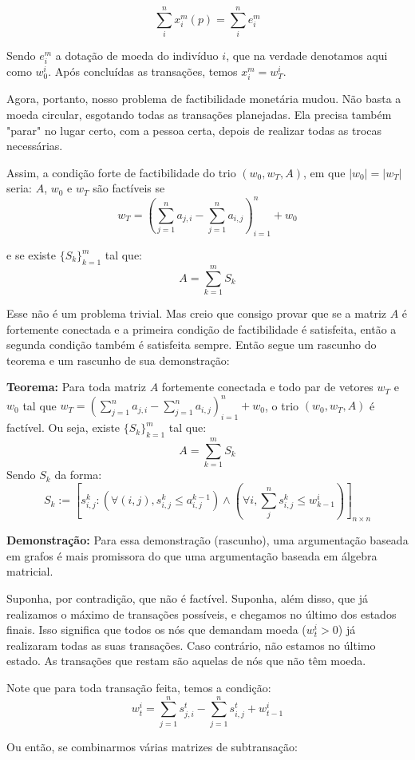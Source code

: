 \documentclass{article}
\begin{document}
$$ \sum^{n}_{i}x^m_i(p) = \sum^n_{i} e^m_i$$
\par Sendo $e^m_i$ a dotação de moeda do indivíduo $i$, que na verdade denotamos aqui como $w^i_0$. Após concluídas as transações, temos $x^m_i = w^i_T$.
\par Agora, portanto, nosso problema de factibilidade monetária mudou. Não basta a moeda circular, esgotando todas as transações planejadas. Ela precisa também "parar" no lugar certo, com a pessoa certa, depois de realizar todas as trocas necessárias.
\par Assim, a condição forte de factibilidade do trio $(w_0, w_T,  A)$, em que $|w_0| = |w_T|$ seria: $A$, $w_0$  e $w_T$ são factíveis se $$w_T = (\sum^n_{j=1}{a_{j,i}} -\sum^n_{j=1}{a_{i,j}}  )^n_{i=1}+w_0$$
\par e se existe $\{S_k\}^m_{k=1}$ tal que:
$$ A = \sum^m_{k=1} S_k$$
\par Esse não é um problema trivial. Mas creio que consigo provar que se a matriz $A$ é fortemente conectada e a primeira condição de factibilidade é satisfeita, então a segunda condição também é satisfeita sempre. Então segue um rascunho do teorema e um rascunho de sua demonstração:
\par \textbf{Teorema:} Para toda matriz $A$ fortemente conectada e todo par de vetores $w_T$ e $w_0$ tal que $w_T = (\sum^n_{j=1}{a_{j,i}} -\sum^n_{j=1}{a_{i,j}}  )^n_{i=1}+w_0$, o trio $(w_0, w_T, A)$ é factível. Ou seja, existe $\{S_k\}_{k=1}^m$ tal que:
$$ A = \sum^m_{k=1} S_k$$
Sendo $S_k$ da forma:
$$ S_{k} := [s^{k}_{i,j}:(\forall(i,j), s^{k}_{i,j} \leq a^{k-1}_{i,j}) \land (\forall i, \sum^n_{j} s^{k}_{i,j} \leq w^i_{k-1})]_{n \times n} $$
\par \textbf{Demonstração:} Para essa demonstração (rascunho), uma argumentação baseada em grafos é mais promissora do que uma argumentação baseada em álgebra matricial.
\par Suponha, por contradição, que não é factível. Suponha, além disso, que já realizamos o máximo de transações possíveis, e chegamos no último dos estados finais. Isso significa que todos os nós que demandam moeda ($w^i_t>0$) já realizaram todas as suas transações. Caso contrário, não estamos no último estado. As transações que restam são aquelas de nós que não têm moeda.
\par Note que para toda transação feita, temos a condição:
$$w^i_t = \sum^n_{j=1} {s^t_{j,i}}-\sum^n_{j=1} {s^t_{i,j}} + w^i_{t-1}$$
\par Ou então, se combinarmos várias matrizes de subtransação:
\end{document}
